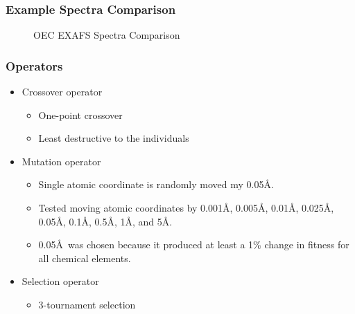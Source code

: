 \documentclass[10pt]{beamer}
\begin{document}
\begin{frame}
	\frametitle{Example Spectra Comparison}

	\begin{figure}
		\caption{OEC EXAFS Spectra Comparison}
	\end{figure}

\end{frame}

\begin{frame}
	\frametitle{Operators}

	\begin{itemize}
		\item Crossover operator
			\begin{itemize}
				\item One-point crossover
				\item Least destructive to the individuals
			\end{itemize}
		\item Mutation operator
			\begin{itemize}
				\item Single atomic coordinate is randomly moved my 0.05\AA.
				\item Tested moving atomic coordinates by 0.001\AA, 0.005\AA, 0.01\AA, 0.025\AA, 0.05\AA, 0.1\AA, 0.5\AA, 1\AA, and 5\AA.
				\item 0.05\AA\ was chosen because it produced at least a 1\% change in fitness for all chemical elements.
			\end{itemize}
		\item Selection operator
			\begin{itemize}
				\item 3-tournament selection
			\end{itemize}
	\end{itemize}

\end{frame}
\end{document}
